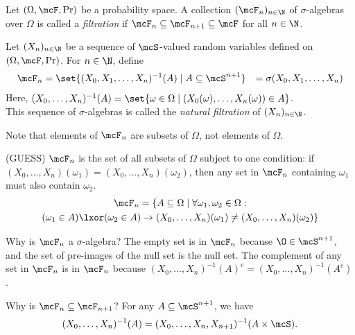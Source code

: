 \begin{definition}[Filtration] \label{def:filtration}
    Let $(\Omega, \F, \Pr)$ be a probability space.
    A collection $(\F_n)_{n \in \N}$ of $\sigma$-algebras over $\Omega$ is
    called a \emph{filtration} if $\F_n \subseteq \F_{n+1} \subseteq \F$
    for all $n \in \N$.
\end{definition}
\begin{definition*} \label{def:natural_filtration}
    Let $(X_n)_{n \in \N}$ be a sequence of $\mcS$-valued random variables
    defined on $(\Omega, \F, \Pr)$.
    For $n \in \N$, define \begin{align*}
        \F_n &= \set{(X_0, X_1, \dots, X_n)^{-1}(A) \mid A \subseteq
                \mcS^{n+1}}
            &= \sigma(X_0, X_1, \dots, X_n)
    \end{align*}
    Here, $(X_0, \dots, X_n)^{-1}(A) = \set{\omega \in \Omega \mid
    (X_0(\omega), \dots, X_n(\omega)) \in A}$. \\
    This sequence of $\sigma$-algebras is called the \emph{natural
    filtration} of $(X_n)_{n \in \N}$.
\end{definition*}
\begin{remark}
    Note that elements of $\F_n$ are subsets of $\Omega$, not elements of
    $\Omega$.

    (GUESS) $\F_n$ is the set of all subsets of $\Omega$ subject to one
    condition: if $(X_0, \dots, X_n)(\omega_1)
    = (X_0, \dots, X_n)(\omega_2)$, then any set in $\F_n$ containing
    $\omega_1$ must also contain $\omega_2$.
    \begin{multline*}
        \F_n = \{A \subseteq \Omega \mid \forall \omega_1, \omega_2
            \in \Omega: \\
            (\omega_1 \in A) \lxor (\omega_2 \in A) \rightarrow
            (X_0, \dots, X_n)(\omega_1) \ne (X_0, \dots, X_n)(\omega_2)\}
    \end{multline*}

    Why is $\F_n$ a $\sigma$-algebra?
    The empty set is in $\F_n$ because $\O \in \mcS^{n+1}$, and the set of
    pre-images of the null set is the null set.
    The complement of any set in $\F_n$ is in $\F_n$ because
    $(X_0, \dots, X_n)^{-1}(A)^c = (X_0, \dots, X_n)^{-1}(A^c)$.

    Why is $\F_n \subseteq \F_{n+1}$?
    For any $A \subseteq \mcS^{n+1}$, we have \[
        (X_0, \dots, X_n)^{-1}(A)
            = (X_0, \dots, X_n, X_{n+1})^{-1}(A \times \mcS).
    \]
\end{remark}

